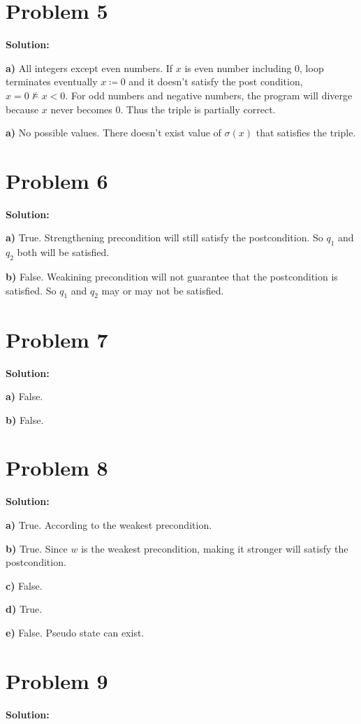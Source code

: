 \documentclass{article}
\begin{document}
\section*{Problem 5}
\textbf{Solution:}

\textbf{a)} All integers except even numbers. If $x$ is even number including 0, loop terminates eventually $x \coloneqq 0$ and it doesn't satisfy the post condition, ${x=0} \nvDash {x<0}$. For odd numbers and negative numbers, the program will diverge because $x$ never becomes $0$. Thus the triple is partially correct.

\textbf{a)} No possible values. There doesn't exist value of $\sigma(x)$ that satisfies the triple.

\section*{Problem 6}
\textbf{Solution:}

\textbf{a)} True. Strengthening precondition will still satisfy the postcondition. So $q_1$ and $q_2$ both will be satisfied.

\textbf{b)} False. Weakining precondition will not guarantee that the postcondition is satisfied. So $q_1$ and $q_2$ may or may not be satisfied.

\section*{Problem 7}
\textbf{Solution:}

\textbf{a)} False.

\textbf{b)} False.

\section*{Problem 8}
\textbf{Solution:}

\textbf{a)} True. According to the weakest precondition.

\textbf{b)} True. Since $w$ is the weakest precondition, making it stronger will satisfy the postcondition.

\textbf{c)} False.

\textbf{d)} True.

\textbf{e)} False. Pseudo state can exist.

\section*{Problem 9}
\textbf{Solution:}
\end{document}
